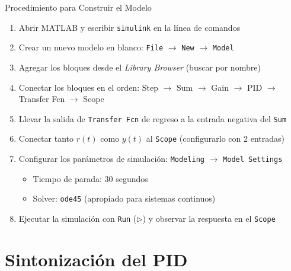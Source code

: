 \documentclass[aspectratio=169,xcolor=dvipsnames]{beamer}
\begin{document}
\begin{frame}{Procedimiento para Construir el Modelo}
    \begin{enumerate}
        \item Abrir MATLAB y escribir \texttt{simulink} en la línea de comandos
        \item Crear un nuevo modelo en blanco: \texttt{File} $\rightarrow$ \texttt{New} $\rightarrow$ \texttt{Model}
        \item Agregar los bloques desde el \textit{Library Browser} (buscar por nombre)
        \item Conectar los bloques en el orden: Step $\rightarrow$ Sum $\rightarrow$ Gain $\rightarrow$ PID $\rightarrow$ Transfer Fcn $\rightarrow$ Scope
        \item Llevar la salida de \texttt{Transfer Fcn} de regreso a la entrada negativa del \texttt{Sum}
        \item Conectar tanto $r(t)$ como $y(t)$ al \texttt{Scope} (configurarlo con 2 entradas)
        \item Configurar los parámetros de simulación: \texttt{Modeling} $\rightarrow$ \texttt{Model Settings}
        \begin{itemize}
            \item Tiempo de parada: 30 segundos
            \item Solver: \texttt{ode45} (apropiado para sistemas continuos)
        \end{itemize}
        \item Ejecutar la simulación con \texttt{Run} ($\triangleright$) y observar la respuesta en el \texttt{Scope}
    \end{enumerate}
\end{frame}

\section{Sintonización del PID}
\end{document}
